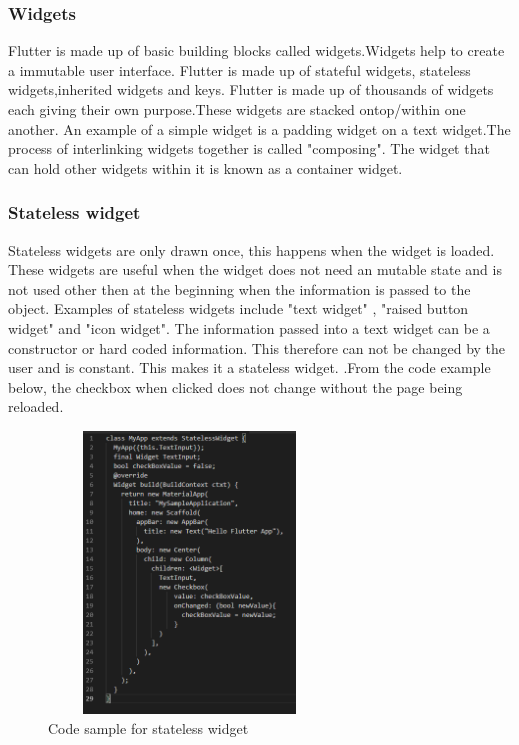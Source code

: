 \subsubsection{Widgets}
Flutter is made up of basic building blocks called widgets.Widgets help to create a immutable user interface. Flutter is made up of stateful widgets, stateless widgets,inherited widgets and keys. Flutter is made up of thousands of widgets each giving their own purpose.These widgets are stacked ontop/within one another. An example of a simple widget is a padding widget on a text widget.The process of interlinking widgets together is called "composing". The widget that can hold other widgets within it is known as a container widget.\cite{widgets}

\subsubsection{Stateless widget}
Stateless widgets are only drawn once, this happens when the widget is loaded. These widgets are useful when the widget does not need an mutable state and is not used other then at the beginning when the information is passed to the object. Examples of stateless widgets include "text widget" , "raised button widget" and "icon widget". The information passed into a text widget can be a constructor or hard coded information. This therefore can not be changed by the user and is constant. This makes it a stateless widget. \cite{birch_2019}.From the code example below, the checkbox when clicked does not change without the page being reloaded.

\begin{figure}[ht!]
    \centering
 \includegraphics[width=75mm, height=75mm,scale=0.5]{img/stateless.PNG}
\caption{Code sample for stateless widget}
\label{fig:stateless}
\end{figure}

